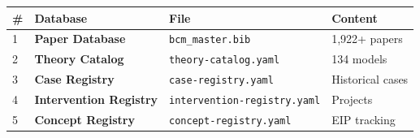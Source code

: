 \begin{tcolorbox}[colback=blue!3!white, colframe=blue!60!black,
    title=\textbf{The 5 Connected Databases}]

\begin{center}
\begin{tabular}{|l|l|l|l|}
\hline
\textbf{\#} & \textbf{Database} & \textbf{File} & \textbf{Content} \\
\hline
\hline
1 & \textbf{Paper Database} & \texttt{bcm\_master.bib} & 1,922+ papers \\
2 & \textbf{Theory Catalog} & \texttt{theory-catalog.yaml} & 134 models \\
3 & \textbf{Case Registry} & \texttt{case-registry.yaml} & Historical cases \\
4 & \textbf{Intervention Registry} & \texttt{intervention-registry.yaml} & Projects \\
5 & \textbf{Concept Registry} & \texttt{concept-registry.yaml} & EIP tracking \\
\hline
\end{tabular}
\end{center}

\end{tcolorbox}

